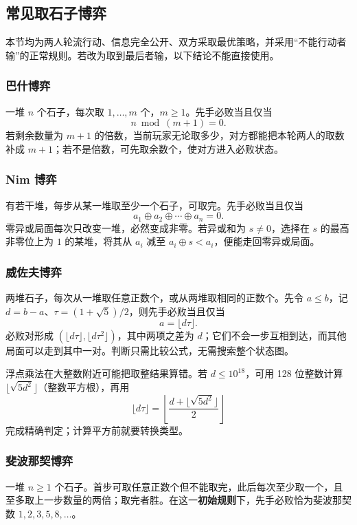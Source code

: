 \subsection{常见取石子博弈}
\label{math:games}
本节均为两人轮流行动、信息完全公开、双方采取最优策略，并采用“不能行动者输”的正常规则。若改为取到最后者输，以下结论不能直接使用。

\subsubsection*{巴什博弈}
一堆 $n$ 个石子，每次取 $1,\ldots,m$ 个，$m\geq1$。先手必败当且仅当
\[
    n\bmod(m+1)=0.
\]
若剩余数量为 $m+1$ 的倍数，当前玩家无论取多少，对方都能把本轮两人的取数补成 $m+1$；若不是倍数，可先取余数个，使对方进入必败状态。

\subsubsection*{Nim 博弈}
有若干堆，每步从某一堆取至少一个石子，可取完。先手必败当且仅当
\[
    a_1\mathbin{\oplus}a_2\mathbin{\oplus}\cdots\mathbin{\oplus}a_n=0.
\]
零异或局面每次只改变一堆，必然变成非零。若异或和为 $s\ne0$，选择在 $s$ 的最高非零位上为 $1$ 的某堆，将其从 $a_i$ 减至 $a_i\mathbin{\oplus}s<a_i$，便能走回零异或局面。

\subsubsection*{威佐夫博弈}
两堆石子，每次从一堆取任意正数个，或从两堆取相同的正数个。先令 $a\leq b$，记 $d=b-a$、$\tau=(1+\sqrt5)/2$，则先手必败当且仅当
\[
    a=\lfloor d\tau\rfloor.
\]
必败对形成 $(\lfloor d\tau\rfloor,\lfloor d\tau^2\rfloor)$，其中两项之差为 $d$；它们不会一步互相到达，而其他局面可以走到其中一对。判断只需比较公式，无需搜索整个状态图。

浮点乘法在大整数附近可能把取整结果算错。若 $d\leq10^{18}$，可用 128 位整数计算 $\lfloor\sqrt{5d^2}\rfloor$（整数平方根），再用
\[
    \lfloor d\tau\rfloor=
    \left\lfloor\frac{d+\lfloor\sqrt{5d^2}\rfloor}{2}\right\rfloor
\]
完成精确判定；计算平方前就要转换类型。

\subsubsection*{斐波那契博弈}
一堆 $n\geq1$ 个石子。首步可取任意正数个但不能取完，此后每次至少取一个，且至多取上一步数量的两倍；取完者胜。在这一\textbf{初始规则}下，先手必败恰为斐波那契数 $1,2,3,5,8,\ldots$。

